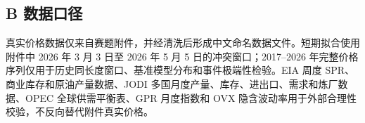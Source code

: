 \subsection*{B 数据口径}

真实价格数据仅来自赛题附件，并经清洗后形成中文命名数据文件。短期拟合使用附件中 2026 年 3 月 3 日至 2026 年 5 月 5 日的冲突窗口；2017--2026 年完整价格序列仅用于历史同长度窗口、基准模型分布和事件极端性检验。EIA 周度 SPR、商业库存和原油产量数据、JODI 多国月度产量、库存、进出口、需求和炼厂数据、OPEC 全球供需平衡表、GPR 月度指数和 OVX 隐含波动率用于外部合理性校验，不反向替代附件真实价格。

\clearpage
